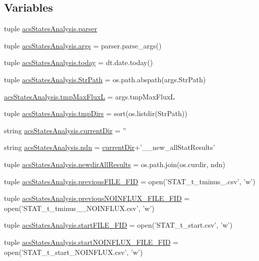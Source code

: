 \subsection*{Variables}
\begin{DoxyCompactItemize}
\item 
tuple \hyperlink{a00132_ac24ead92a86e25ec9213d8c7253d4b60}{acs\+States\+Analysis.\+parser}
\item 
tuple \hyperlink{a00132_a4912a255d0be60fffea119e6bd92b6e4}{acs\+States\+Analysis.\+args} = parser.\+parse\+\_\+args()
\item 
tuple \hyperlink{a00132_ac99ee9d8196d8a2305b9f4c795b23b97}{acs\+States\+Analysis.\+today} = dt.\+date.\+today()
\item 
tuple \hyperlink{a00132_ac34f3f43f888eb6620266d78ce928ceb}{acs\+States\+Analysis.\+Str\+Path} = os.\+path.\+abspath(args.\+Str\+Path)
\item 
\hyperlink{a00132_a22a52c6b87e96dc826bc621ee88c380a}{acs\+States\+Analysis.\+tmp\+Max\+Flux\+L} = args.\+tmp\+Max\+Flux\+L
\item 
tuple \hyperlink{a00132_ab71c19ee20acae0f07934a8d0e9fe50b}{acs\+States\+Analysis.\+tmp\+Dirs} = sort(os.\+listdir(Str\+Path))
\item 
string \hyperlink{a00132_ae98225d5c8c20399f5c3b888fa37746f}{acs\+States\+Analysis.\+current\+Dir} = ''
\item 
string \hyperlink{a00132_a5e117df6e0cdffdae13947622c6c4890}{acs\+States\+Analysis.\+ndn} = \hyperlink{a00031_af32eb97339f1e9d37b5540de2cbc79c9}{current\+Dir}+'\+\_\+\_\+new\+\_\+all\+Stat\+Results'
\item 
tuple \hyperlink{a00132_a62d6cfd52b4428ab7ea4d75d43b2d49b}{acs\+States\+Analysis.\+newdir\+All\+Results} = os.\+path.\+join(os.\+curdir, ndn)
\item 
tuple \hyperlink{a00132_aba65725a1bd6d1b891b02dc7f3db2335}{acs\+States\+Analysis.\+previous\+F\+I\+L\+E\+\_\+\+F\+I\+D} = open('S\+T\+A\+T\+\_\+t\+\_\+tminus\+\_.\+csv', 'w')
\item 
tuple \hyperlink{a00132_a9f9485bf6f7a3734bbd110b756005b71}{acs\+States\+Analysis.\+previous\+N\+O\+I\+N\+F\+L\+U\+X\+\_\+\+F\+I\+L\+E\+\_\+\+F\+I\+D} = open('S\+T\+A\+T\+\_\+t\+\_\+tminus\+\_\+\_\+\+N\+O\+I\+N\+F\+L\+U\+X.\+csv', 'w')
\item 
tuple \hyperlink{a00132_a0239a9dcc4900463a0c19557bec23521}{acs\+States\+Analysis.\+start\+F\+I\+L\+E\+\_\+\+F\+I\+D} = open('S\+T\+A\+T\+\_\+t\+\_\+start.\+csv', 'w')
\item 
tuple \hyperlink{a00132_a44f4f158af9771fbabbbacc4f4484d32}{acs\+States\+Analysis.\+start\+N\+O\+I\+N\+F\+L\+U\+X\+\_\+\+F\+I\+L\+E\+\_\+\+F\+I\+D} = open('S\+T\+A\+T\+\_\+t\+\_\+start\+\_\+\+N\+O\+I\+N\+F\+L\+U\+X.\+csv', 'w')

\end{DoxyCompactItemize}
